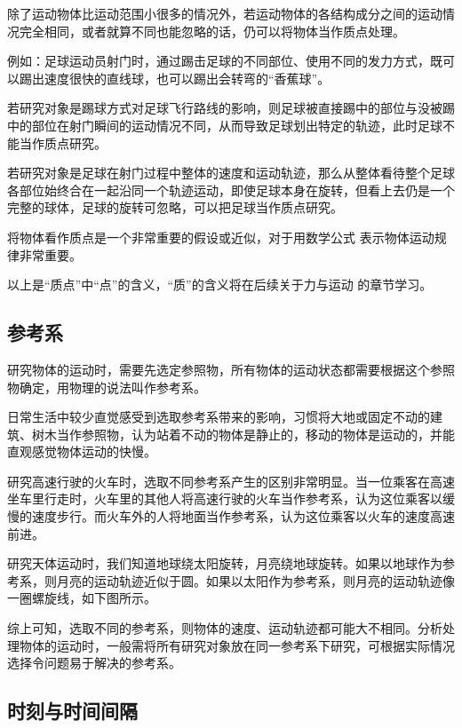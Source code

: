 \documentclass[color=blue]{textbook-cn}%
\begin{document}
除了运动物体比运动范围小很多的情况外，若运动物体的各结构成分之间的运动情况完全相同，或者就算不同也能忽略的话，仍可以将物体当作质点处理。


例如：足球运动员射门时，通过踢击足球的不同部位、使用不同的发力方式，既可以踢出速度很快的直线球，也可以踢出会转弯的“香蕉球”。


若研究对象是踢球方式对足球飞行路线的影响，则足球被直接踢中的部位与没被踢中的部位在射门瞬间的运动情况不同，从而导致足球划出特定的轨迹，此时足球不能当作质点研究。


若研究对象是足球在射门过程中整体的速度和运动轨迹，那么从整体看待整个足球各部位始终合在一起沿同一个轨迹运动，即使足球本身在旋转，但看上去仍是一个完整的球体，足球的旋转可忽略，可以把足球当作质点研究。


将物体看作质点是一个非常重要的假设或近似，对于用数学公式
表示物体运动规律非常重要。


以上是“质点”中“点”的含义，“质”的含义将在后续关于力与运动
的章节学习。



\subsection{参考系}

\begin{Definition*}[参考系]
研究物体的运动时，需要先选定参照物，所有物体的运动状态都需要根据这个参照物确定，用物理的说法叫作\textsf{参考系}。
\end{Definition*}


日常生活中较少直觉感受到选取参考系带来的影响，习惯将大地或固定不动的建筑、树木当作参照物，认为站着不动的物体是静止的，移动的物体是运动的，并能直观感觉物体运动的快慢。


研究高速行驶的火车时，选取不同参考系产生的区别非常明显。当一位乘客在高速坐车里行走时，火车里的其他人将高速行驶的火车当作参考系，认为这位乘客以缓慢的速度步行。而火车外的人将地面当作参考系，认为这位乘客以火车的速度高速前进。


研究天体运动时，我们知道地球绕太阳旋转，月亮绕地球旋转。如果以地球作为参考系，则月亮的运动轨迹近似于圆。如果以太阳作为参考系，则月亮的运动轨迹像一圈螺旋线，如下图所示。


综上可知，选取不同的参考系，则物体的速度、运动轨迹都可能大不相同。分析处理物体的运动时，一般需将所有研究对象放在同一参考系下研究，可根据实际情况选择令问题易于解决的参考系。



\subsection{时刻与时间间隔}
\end{document}
